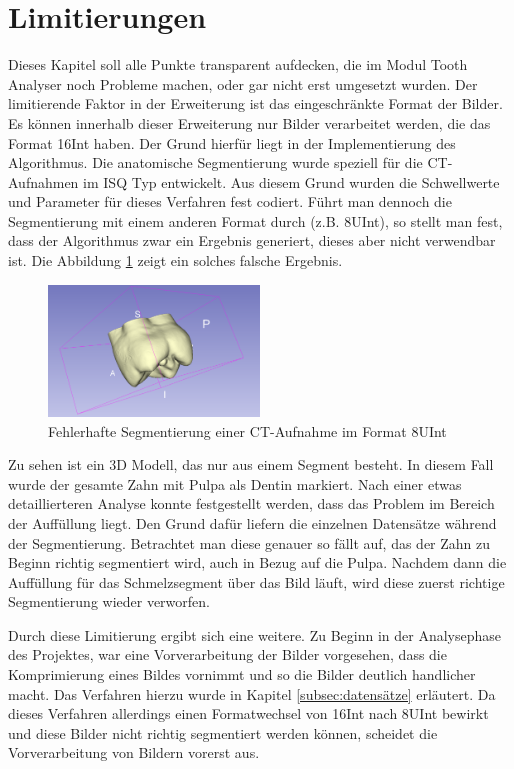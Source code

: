 \section{Limitierungen}
\label{sec:limitierungen} Dieses Kapitel soll alle Punkte transparent aufdecken,
die im Modul Tooth Analyser noch Probleme machen, oder gar nicht erst umgesetzt
wurden. Der limitierende Faktor in der Erweiterung ist das eingeschränkte Format
der Bilder. Es können innerhalb dieser Erweiterung nur Bilder verarbeitet werden,
die das Format \ac{16Int} haben. Der Grund hierfür liegt in der Implementierung des
Algorithmus. Die anatomische Segmentierung wurde speziell für die \ac{CT}-Aufnahmen
im \ac{ISQ} Typ entwickelt. Aus diesem Grund wurden die Schwellwerte und Parameter
für dieses Verfahren fest codiert. Führt man dennoch die Segmentierung mit einem
anderen Format durch (z.B. \ac{8UInt}), so stellt man fest, dass der Algorithmus
zwar ein Ergebnis generiert, dieses aber nicht verwendbar ist. Die Abbildung
\ref{fig:3d_error} zeigt ein solches falsche Ergebnis.

\begin{figure}[h]
	\centering
	\includegraphics[width=0.5\textwidth]{img/3d_view_error.png}
	\caption{Fehlerhafte Segmentierung einer CT-Aufnahme im Format 8UInt}
	\label{fig:3d_error}
\end{figure}

Zu sehen ist ein 3D Modell, das nur aus einem Segment besteht. In diesem Fall wurde
der gesamte Zahn mit Pulpa als Dentin markiert. Nach einer etwas detaillierteren
Analyse konnte festgestellt werden, dass das Problem im Bereich der Auffüllung liegt.
Den Grund dafür liefern die einzelnen Datensätze während der Segmentierung. Betrachtet
man diese genauer so fällt auf, das der Zahn zu Beginn richtig segmentiert wird,
auch in Bezug auf die Pulpa. Nachdem dann die Auffüllung für das Schmelzsegment
über das Bild läuft, wird diese zuerst richtige Segmentierung wieder verworfen.

Durch diese Limitierung ergibt sich eine weitere. Zu Beginn in der Analysephase
des Projektes, war eine Vorverarbeitung der Bilder vorgesehen, dass die
Komprimierung eines Bildes vornimmt und so die Bilder deutlich handlicher macht.
Das Verfahren hierzu wurde in Kapitel \ref{subsec:datensätze} erläutert. Da
dieses Verfahren allerdings einen Formatwechsel von \ac{16Int} nach \ac{8UInt}
bewirkt und diese Bilder nicht richtig segmentiert werden können, scheidet die Vorverarbeitung
von Bildern vorerst aus.

